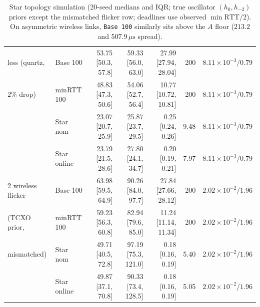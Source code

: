 \documentclass[11pt,a4paper]{article}
\theoremstyle{definition}
\begin{document}
\begin{table}[htb]
\begin{tabular}{@{}ll r r r r r@{}}
less (quartz, & Base 100 & 53.75 [50.3, 57.8] & 59.33 [56.0, 63.0] & 27.99 [27.94, 28.04] & 200 & $8.11{\times}10^{-3} / 0.79$ \\
2\% drop) & minRTT 100 & 48.83 [47.3, 50.6] & 54.06 [52.7, 56.4] & 10.77 [10.72, 10.81] & 200 & $8.11{\times}10^{-3} / 0.79$ \\
 & Star nom & 23.07 [20.7, 25.9] & 25.87 [23.7, 29.5] & 0.25 [0.24, 0.26] & 9.48 & $8.11{\times}10^{-3} / 0.79$ \\
 & Star online & 23.79 [21.5, 28.6] & 27.80 [24.1, 34.7] & 0.20 [0.19, 0.21] & 7.97 & $8.11{\times}10^{-3} / 0.79$ \\
\midrule
2 wireless flicker & Base 100 & 63.98 [59.5, 64.9] & 90.26 [84.0, 97.7] & 27.84 [27.66, 28.12] & 200 & $2.02{\times}10^{-2} / 1.96$ \\
(TCXO prior, & minRTT 100 & 59.23 [56.3, 60.8] & 82.94 [79.6, 85.0] & 11.24 [11.14, 11.34] & 200 & $2.02{\times}10^{-2} / 1.96$ \\
mismatched) & Star nom & 49.71 [40.5, 72.8] & 97.19 [75.3, 121.0] & 0.18 [0.16, 0.19] & 5.40 & $2.02{\times}10^{-2} / 1.96$ \\
 & Star online & 49.87 [37.1, 70.8] & 90.33 [73.4, 128.5] & 0.18 [0.16, 0.19] & 5.05 & $2.02{\times}10^{-2} / 1.96$ \\
\bottomrule
\end{tabular}
\caption{Star topology simulation (20-seed medians and IQR; true oscillator
$(h_0, h_{-2})$ priors except the mismatched flicker row; deadlines use
observed $\min\mathrm{RTT}/2$). On asymmetric wireless links, \texttt{Base 100}
similarly sits above the $A$ floor ($213.2$ and $507.9\,\mu\text{s}$ spread).}
\label{tab:star}
\end{table}
\end{document}
